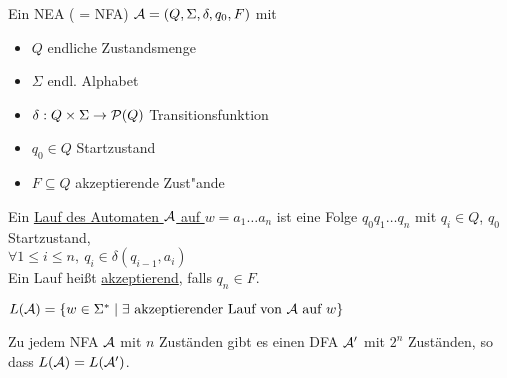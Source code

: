 \begin{Def}[name={[NEA]}]
	Ein \ac{NEA} ( = \acl{NFA}) $\mathcal{A} = (Q,\Sigma,\delta,q_0,F)$ mit
	\begin{itemize}
		\item $Q$ endliche Zustandsmenge
		\item $\Sigma$ endl. Alphabet
		\item $\delta:Q\x\Sigma\->\mathcal{P}(Q)$ Transitionsfunktion
		\item $q_0\in Q$ Startzustand
		\item $F\subseteq Q$ akzeptierende Zust"ande
	\end{itemize}
\end{Def}
\begin{Def}[name={[Lauf eines Automaten]}]
	Ein \underline{Lauf des Automaten $\mathcal{A}$ auf $w=a_1\dots a_n$} ist eine Folge $q_0q_1\dots q_n$ mit $q_i\in Q$, $q_0$ Startzustand,\\
	$\forall 1\leq i\leq n,\ q_i\in\delta(q_{i-1},a_i)$\\
	Ein Lauf heißt \underline{akzeptierend}, falls $q_n\in F$.
\end{Def}
\begin{Def}[name={[NFA zu DFA]}]
	$L(\mathcal{A})=\{ w\in\Sigma^* \mid \exists\text{ akzeptierender Lauf von $\mathcal{A}$ auf }w \}$
\end{Def}
\begin{Satz}[Rabin]
	Zu jedem \ac{NFA} $\mathcal{A}$ mit $n$ Zuständen gibt es einen \ac{DFA} $\mathcal{A}'$ mit $2^n$ Zuständen, so dass $L(\mathcal{A})=L(\mathcal{A}')$.
\end{Satz}
